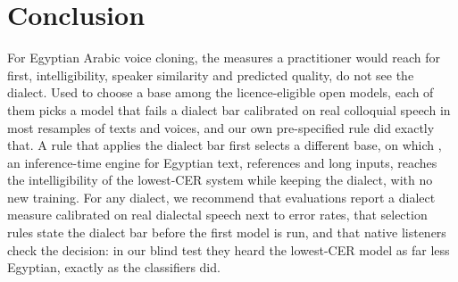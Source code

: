 \section{Conclusion}\label{sec:conclusion}

For Egyptian Arabic voice cloning, the measures a practitioner would reach for first, intelligibility, speaker
similarity and predicted quality, do not see the dialect. Used to choose a base among the licence-eligible open
models, each of them picks a model that fails a dialect bar calibrated on real colloquial speech in most resamples
of texts and voices, and our own pre-specified rule did exactly that. A rule that applies the dialect bar first
selects a different base, on which \BA, an inference-time engine for Egyptian text, references and long inputs,
reaches the intelligibility of the lowest-CER system while keeping the dialect, with no new training. For any dialect,
we recommend that evaluations report a dialect measure calibrated on real dialectal speech next to error rates, that
selection rules state the dialect bar before the first model is run, and that native listeners check the decision:
in our blind test they heard the lowest-CER model as far less Egyptian, exactly as the classifiers did.
